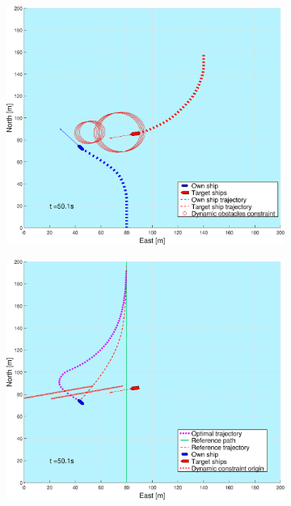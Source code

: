 \begin{figure}[ht!]
\begin{subfigure}[b]{0.494\textwidth}
        \subcaption{}
    \end{subfigure}
    \hfill
    \\
    \begin{subfigure}[b]{0.494\textwidth}
        \centering
        \includegraphics[width=\textwidth]{Images/Figures/sving_GW/_Simple_1fig1_time=50}
        \subcaption{}
    \end{subfigure}
    \hfill
    \begin{subfigure}[b]{0.494\textwidth}
        \centering
        \includegraphics[width=\textwidth]{Images/Figures/sving_GW/_Simple_1fig999_time=50}

\end{subfigure}
\end{figure}
